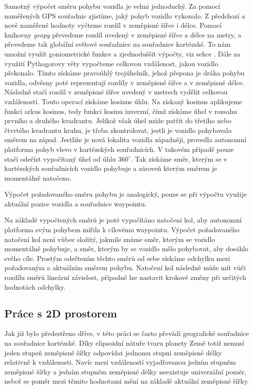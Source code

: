 \documentclass[czech, bachelor]{diploma}
\begin{document}
Samotný výpočet směru pohybu vozidla je velmi jednoduchý. Za pomocí naměřených GPS souřadnic zjistíme, jaký pohyb vozidlo
vykonalo. Z předchozí a nově naměřené hodnoty vyčteme rozdíl v zeměpisné šířce i délce. Pomocí knihovny \emph{geopy} převedeme
rozdíl uvedený v zeměpisné šířce a délce na metry, a převedeme tak globální světové souřadnice na souřadnice kartézské. To nám
umožní využít goniometrické funkce a zjednoduššit výpočty, viz sekce . Dále za využití Pythagorovy
věty vypočteme celkovou vzdálenost, jakou vozidlo překonalo. Tímto získáme pravoúhlý trojúhelník, jehož přepona je dráha
pohybu vozidla, odvěsny poté reprezentují rozdíly v zeměpisné šířce a v zeměpisné délce. Následně stačí rozdíl v zeměpisné šířce
uvedený v metrech vydělit celkovou vzdáleností. Touto operací získáme kosinus úhlu. Na získaný kosinus aplikujeme funkci arkus
kosinus, tedy funkci kosinu inverzní, čímž získáme úhel v rozsahu prvního a druhého kvadrantu. Jelikož však úhel může patřit do
třetího nebo čtvrtého kvadrantu kruhu, je třeba zkontrolovat, jestli je vozidlo pohybovalo směrem na západ. Jestliže je nová
lokalita vozidla západněji, provedla autonomní platforma pohyb vlevo v kartézských souřadnicích. V takovém případě pouze stačí
odečíst vypočítaný úhel od úhlu $360^{\circ}$. Tak získáme směr, kterým se v kartézských souřadnicích vozidlo pohybuje a zároveň
kterým směrem je momentálně natočeno.

Výpočet požadovaného směru pohybu je analogický, pouze se při výpočtu využije aktuální pozice vozidla a souřadnice waypointu.

Na základě vypočtených směrů je poté vypočítáno natočení kol, aby autonomní platforma svým pohybem mířila k cílovému waypointu.
Výpočet požadovaného natočení kol není vůbec složitý, jakmile známe směr, kterým se vozidlo momentálně pohybuje, a směr, kterým
by se vozidlo mělo pohybovat, aby dosáhlo svého cíle. Prostým odečtením těchto směrů od sebe získáme odchylku mezi požadovaným
a aktuálním směrem pohybu. Natočení kol následně může mít vůči rozdílu směrů lineární závislost, případně lze nastavit krokové
změny při určitých hodnotách odchylky.

\subsection{Práce s 2D prostorem} \label{cartesian-coordinates}

Jak již bylo předestřeno dříve, v této práci se často převádí geografické souřadnice na souřadnice kartézské. Díky elipsoidní
nátuře tvaru planety Země totiž nemusí jeden stupeň zeměpisné šířky odpovídat jednomu stupni zeměpisné délky relativně
k vzdálenosti. Navíc mezi vzdáleností vyjadřovanou jedním stupněm zeměpisné šířky a jedním stupněm zeměpisné délky neexistuje
univerzální poměr, neboť se poměr mezi těmito hodnotami mění na základě aktuální zeměpisné šířky.
\end{document}
